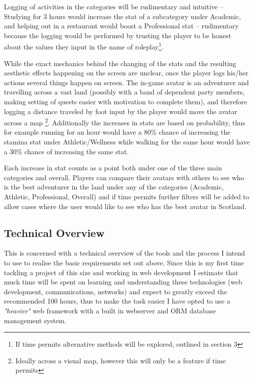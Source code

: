 \documentclass[11pt, a4paper]{article}
\begin{document}
Logging of activities in the categories will be rudimentary and intuitive -- Studying for 3 hours would increase the stat of a subcategory under Academic, and helping out in a restaurant would boost a Professional stat -- rudimentary because the logging would be performed by trusting the player to be honest about the values they input in the name of roleplay\footnote{If time permits alternative methods will be explored, outlined in section 3}.

While the exact mechanics behind the changing of the stats and the resulting aesthetic effects happening on the screen are unclear, once the player logs his/her actions several things happen on screen. The in-game avatar is an adventurer and travelling across a vast land (possibly with a band of dependent party members, making setting of quests easier with motivation to complete them), and therefore logging a distance traveled by foot input by the player would move the avatar across a map \footnote{Ideally across a visual map, however this will only be a feature if time permits}. Additionally the increases in stats are based on probability, thus for example running for an hour would have a 80\% chance of increasing the stamina stat under Athletic/Wellness while walking for the same hour would have a 30\% chance of increasing the same stat.

Each increase in stat counts as a point both under one of the three main categories and overall. Players can compare their avatars with others to see who is the best adventurer in the land under any of the categories (Academic, Athletic, Professional, Overall) and if time permits further filters will be added to allow cases where the user would like to see who has the best avatar in Scotland.

\subsection{Technical Overview}
This is concerned with a technical overview of the tools and the process I intend to use to realise the basic requirements set out above. Since this is my first time tackling a project of this size and working in web development I estimate that much time will be spent on learning and understanding these technologies (web development, communications, networks) and expect to greatly exceed the recommended 100 hours, thus to make the task easier I have opted to use a \textit{"heavier"} web framework with a built in webserver and ORM database management system. \\
\end{document}
